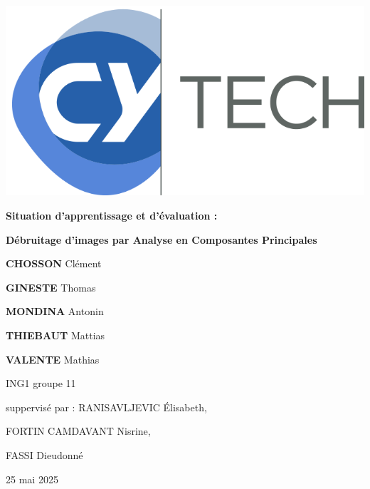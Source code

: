 \begin{titlepage}
    \begin{center}
        \includegraphics[width=0.5\linewidth]{reference/picture/CYTECHlogo.png}\par\vspace{1cm}
        \vspace{0.5cm}
        {\huge \bfseries Situation d'apprentissage et d'évaluation : \par}
        {\huge \bfseries Débruitage d'images par Analyse en Composantes Principales \par}
    \end{center}
    \vspace{4cm}
    {\Large \textbf{CHOSSON} Clément\par}
    {\Large \textbf{GINESTE} Thomas \par}
    {\Large \textbf{MONDINA} Antonin \par}
    {\Large \textbf{THIEBAUT} Mattias \par}
    {\Large \textbf{VALENTE} Mathias \par}
    \vspace{0.5cm}
    {\large ING1 groupe 11 \par}
    \vspace{3cm}
    suppervisé par : RANISAVLJEVIC Élisabeth, \par
    \hspace{2.74cm}    
    FORTIN CAMDAVANT Nisrine, \par
    \hspace{2.74cm}    
    FASSI Dieudonné
    \vspace{4cm}
    \begin{center}
        25 mai 2025
    \end{center}
\end{titlepage}

\tableofcontents
